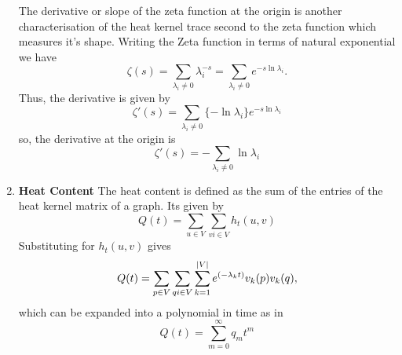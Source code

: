 \documentclass[10pt,a4paper]{article}
\begin{document}
\begin{enumerate}[1]
        	The derivative or slope of the zeta function at the origin is another characterisation of the heat kernel trace second to the zeta function which measures it's shape. Writing the Zeta function in terms of natural exponential we have
        	\begin{equation}
        	\zeta(s) = \sum_{\lambda_i \neq 0} \lambda_{i} ^{-s} = \sum_{\lambda_i \neq 0} e^{-s \ln \lambda_i}.
        	\end{equation}
        	Thus, the derivative is given by
        	\begin{equation}
        	\zeta'(s) = \sum_{\lambda_i \neq 0} \{-\ln \lambda_i\}
        	e^{-s \ln \lambda_i}
        	\end{equation}
        	so, the derivative at the origin is 
        	\begin{equation}
	        \zeta'(s) = -\sum_{\lambda_i \neq 0}\ln \lambda_i
        	\end{equation}
        	\item \textbf{Heat Content}
        	The heat content is defined as the sum of the entries of the heat kernel matrix of a graph. Its given by
        	\begin{equation}
        	Q(t) = \sum_{u \in V} \sum_{v i\in V} h_{t}(u,v)
        	\end{equation}
        	Substituting for $h_t(u,v)$ gives
        	\begin{equation}
        	Q(t) = \sum_{p \in V} \sum_{q i\in V} \sum_{k=1}^{\arrowvert V\arrowvert} e^{(-\lambda_{k} t)} v_{k}(p) v_{k}(q),
        	\end{equation}
        	which can be expanded into a polynomial in time as in \citep{mcdonald2002diffusions}
        	\begin{equation}
        	Q(t) = \sum_{m=0}^{\infty} q_m t^m
        	\end{equation}
        \end{enumerate}
    
\end{document}
